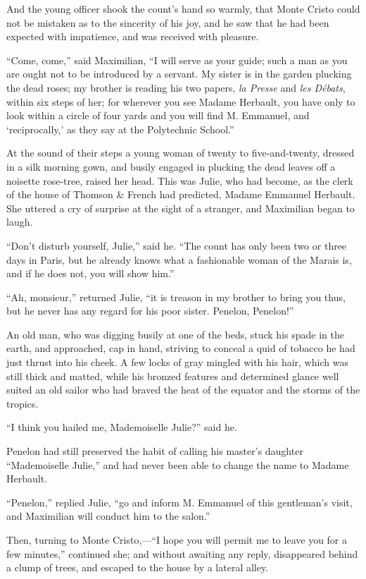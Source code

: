 And the young officer shook the count’s hand so warmly, that Monte
Cristo could not be mistaken as to the sincerity of his joy, and he saw
that he had been expected with impatience, and was received with
pleasure.

“Come, come,” said Maximilian, “I will serve as your guide; such a man
as you are ought not to be introduced by a servant. My sister is in the
garden plucking the dead roses; my brother is reading his two papers,
\textit{la Presse} and \textit{les Débats}, within six steps of her; for wherever you
see Madame Herbault, you have only to look within a circle of four
yards and you will find M. Emmanuel, and ‘reciprocally,’ as they say at
the Polytechnic School.”

At the sound of their steps a young woman of twenty to five-and-twenty,
dressed in a silk morning gown, and busily engaged in plucking the dead
leaves off a noisette rose-tree, raised her head. This was Julie, who
had become, as the clerk of the house of Thomson \& French had
predicted, Madame Emmanuel Herbault. She uttered a cry of surprise at
the sight of a stranger, and Maximilian began to laugh.

“Don’t disturb yourself, Julie,” said he. “The count has only been two
or three days in Paris, but he already knows what a fashionable woman
of the Marais is, and if he does not, you will show him.”

“Ah, monsieur,” returned Julie, “it is treason in my brother to bring
you thus, but he never has any regard for his poor sister. Penelon,
Penelon!”

An old man, who was digging busily at one of the beds, stuck his spade
in the earth, and approached, cap in hand, striving to conceal a quid
of tobacco he had just thrust into his cheek. A few locks of gray
mingled with his hair, which was still thick and matted, while his
bronzed features and determined glance well suited an old sailor who
had braved the heat of the equator and the storms of the tropics.

“I think you hailed me, Mademoiselle Julie?” said he.

Penelon had still preserved the habit of calling his master’s daughter
“Mademoiselle Julie,” and had never been able to change the name to
Madame Herbault.

“Penelon,” replied Julie, “go and inform M. Emmanuel of this
gentleman’s visit, and Maximilian will conduct him to the salon.”

Then, turning to Monte Cristo,—“I hope you will permit me to leave you
for a few minutes,” continued she; and without awaiting any reply,
disappeared behind a clump of trees, and escaped to the house by a
lateral alley.

